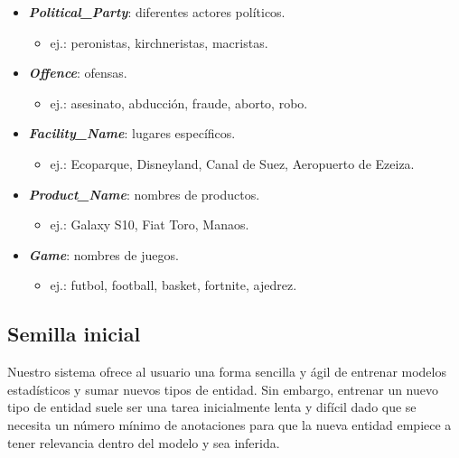 \documentclass[12pt,a4paper,]{scrartcl}
\providecommand{\tightlist}{%
  \setlength{\itemsep}{0pt}\setlength{\parskip}{0pt}}
\begin{document}
\begin{itemize}
\tightlist
\item
  \textbf{\emph{Political\_Party}}: diferentes actores políticos.

  \begin{itemize}
  \tightlist
  \item
    ej.: peronistas, kirchneristas, macristas.
  \end{itemize}
\item
  \textbf{\emph{Offence}}: ofensas.

  \begin{itemize}
  \tightlist
  \item
    ej.: asesinato, abducción, fraude, aborto, robo.
  \end{itemize}
\item
  \textbf{\emph{Facility\_Name}}: lugares específicos.

  \begin{itemize}
  \tightlist
  \item
    ej.: Ecoparque, Disneyland, Canal de Suez, Aeropuerto de Ezeiza.
  \end{itemize}
\item
  \textbf{\emph{Product\_Name}}: nombres de productos.

  \begin{itemize}
  \tightlist
  \item
    ej.: Galaxy S10, Fiat Toro, Manaos.
  \end{itemize}
\item
  \textbf{\emph{Game}}: nombres de juegos.

  \begin{itemize}
  \tightlist
  \item
    ej.: futbol, football, basket, fortnite, ajedrez.
  \end{itemize}
\end{itemize}

\hypertarget{semilla-inicial}{%
\subsection{Semilla inicial}\label{semilla-inicial}}

Nuestro sistema ofrece al usuario una forma sencilla y ágil de entrenar modelos estadísticos y sumar nuevos tipos de entidad. Sin embargo, entrenar un nuevo tipo de entidad suele ser una tarea inicialmente lenta y difícil dado que se necesita un número mínimo de anotaciones para que la nueva entidad empiece a tener relevancia dentro del modelo y sea inferida.
\end{document}

